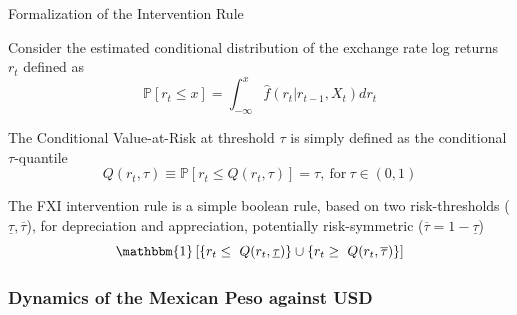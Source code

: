 \documentclass{beamer}
\newenvironment{largeitemize}{\itemize\addtolength{\itemsep}{10pt}}{\enditemize}
\begin{document}
\begin{frame}{Formalization of the Intervention Rule}
  \begin{largeitemize}
    \item Consider the estimated conditional distribution of the exchange rate log
      returns $r_t$ defined as
      \begin{equation*}
      \mathbb{P}[r_t \leq x] = \int_{-\infty}^{x}\hat{f}(r_t | r_{t-1}, X_t)
      dr_t        
      \end{equation*}
    \item The Conditional Value-at-Risk at threshold $\tau$ is simply defined as
      the conditional $\tau$-quantile
      \begin{equation*}
      Q(r_t, \tau) \equiv  \mathbb{P}[r_t
      \leq Q(r_t, \tau)] = \tau, \ \text{for} \ \tau \in (0,1)
      \end{equation*}        
    \item The FXI intervention rule is a simple boolean rule, based on two
      risk-thresholds ($\underline{\tau}, \overline{\tau}$), for depreciation
      and appreciation, potentially risk-symmetric ($\overline{\tau} = 1 - \underline{\tau}$)
      \begin{equation*}
\mathbbm{1} \left[ \{r_t \leq \ Q(r_t, \underline{\tau})\} \cup \{r_t \geq \
  Q(r_t, \overline{\tau})\} \right]
      \end{equation*}                
  \end{largeitemize}
  
\end{frame}

\begin{frame}
\frametitle{Dynamics of the Mexican Peso against USD}
\end{frame}
\end{document}
